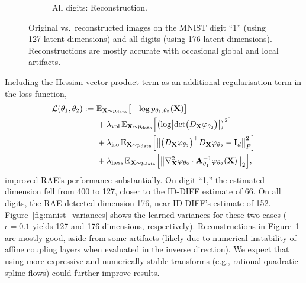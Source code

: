\begin{figure}[h!]
\begin{subfigure}[b]{0.45\textwidth}
            \caption{\scriptsize All digits: Reconstruction.}
        \end{subfigure}
        \caption{Original vs.\ reconstructed images on the MNIST digit ``1'' (using 127 latent dimensions) and all digits (using 176 latent dimensions). Reconstructions are mostly accurate with occasional global and local artifacts.}
        \label{fig:mnist_reconstructions}
    \end{figure}

    Including the Hessian vector product term as an additional regularisation term in the loss function, 
    \begin{align}
        \label{eq:mnist_training_objective}
        \mathcal{L}(\theta_1, \theta_2) :=\ & \mathbb{E}_{\mathbf{X} \sim p_{\text{data}}}\bigl[-\log p_{\theta_1, \theta_2}(\mathbf{X})\bigr] \notag \\
        & + \lambda_{\text{vol}} \, \mathbb{E}_{\mathbf{X} \sim p_{\text{data}}}\Bigl[\bigl(\log \bigl|\det\bigl(D_{\mathbf{X}}\varphi_{\theta_2}\bigr)\bigr|\bigr)^2\Bigr] \notag \\
        & + \lambda_{\text{iso}} \, \mathbb{E}_{\mathbf{X} \sim p_{\text{data}}}\Bigl[\bigl\|\bigl(D_{\mathbf{X}}\varphi_{\theta_2}\bigr)^\top D_{\mathbf{X}}\varphi_{\theta_2} - \mathbf{I}_d\bigr\|_F^2\Bigr] \notag \\
        & + \lambda_{\text{hess}} \, \mathbb{E}_{\mathbf{X} \sim p_{\text{data}}}\Bigl[\bigl\|\nabla^2_{\mathbf{X}}\varphi_{\theta_2} \cdot \mathbf{A}_{\theta_1}^{-1} \varphi_{\theta_2}(\mathbf{X})\bigr\|_2\Bigr],
    \end{align}
    improved RAE's performance substantially. On digit ``1,'' the estimated dimension fell from 400 to 127, closer to the ID-DIFF estimate of 66. On all digits, the RAE detected dimension 176, near ID-DIFF’s estimate of 152. Figure~\ref{fig:mnist_variances} shows the learned variances for these two cases ($\epsilon = 0.1$ yields 127 and 176 dimensions, respectively). Reconstructions in Figure~\ref{fig:mnist_reconstructions} are mostly good, aside from some artifacts (likely due to numerical instability of affine coupling layers when evaluated in the inverse direction). We expect that using more expressive and numerically stable transforms (e.g., rational quadratic spline flows) could further improve results.
    
    
    
    
    
